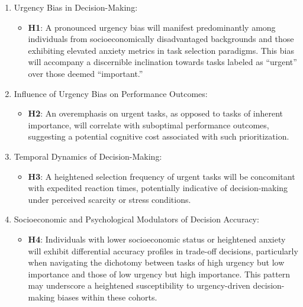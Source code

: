 \documentclass[
]{report}
\providecommand{\tightlist}{%
  \setlength{\itemsep}{0pt}\setlength{\parskip}{0pt}}\usepackage{longtable,booktabs,array}
\begin{document}
\begin{enumerate}
\def\labelenumi{\arabic{enumi}.}
\tightlist
\item
  Urgency Bias in Decision-Making:

  \begin{itemize}
  \tightlist
  \item
    \textbf{H1}: A pronounced urgency bias will manifest predominantly
    among individuals from socioeconomically disadvantaged backgrounds
    and those exhibiting elevated anxiety metrics in task selection
    paradigms. This bias will accompany a discernible inclination
    towards tasks labeled as ``urgent'' over those deemed ``important.''
  \end{itemize}
\item
  Influence of Urgency Bias on Performance Outcomes:

  \begin{itemize}
  \tightlist
  \item
    \textbf{H2}: An overemphasis on urgent tasks, as opposed to tasks of
    inherent importance, will correlate with suboptimal performance
    outcomes, suggesting a potential cognitive cost associated with such
    prioritization.
  \end{itemize}
\item
  Temporal Dynamics of Decision-Making:

  \begin{itemize}
  \tightlist
  \item
    \textbf{H3}: A heightened selection frequency of urgent tasks will
    be concomitant with expedited reaction times, potentially indicative
    of decision-making under perceived scarcity or stress conditions.
  \end{itemize}
\item
  Socioeconomic and Psychological Modulators of Decision Accuracy:

  \begin{itemize}
  \tightlist
  \item
    \textbf{H4}: Individuals with lower socioeconomic status or
    heightened anxiety will exhibit differential accuracy profiles in
    trade-off decisions, particularly when navigating the dichotomy
    between tasks of high urgency but low importance and those of low
    urgency but high importance. This pattern may underscore a
    heightened susceptibility to urgency-driven decision-making biases
    within these cohorts.
  \end{itemize}
\end{enumerate}
\end{document}
